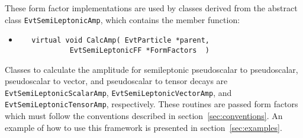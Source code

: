 \noindent These form factor implementations are used by classes
derived from the abstract class {\tt EvtSemiLeptonicAmp},
which contains the member function:
\begin{itemize}
\item \begin{verbatim}   virtual void CalcAmp( EvtParticle *parent,
            EvtSemiLeptonicFF *FormFactors  ) 
\end{verbatim}
\end{itemize}
Classes to calculate the amplitude for semileptonic pseudoscalar to
pseudoscalar, pseudoscalar to vector, and 
pseudoscalar to tensor decays are 
{\tt EvtSemiLeptonicScalarAmp},
{\tt EvtSemiLeptonicVectorAmp}, and
{\tt EvtSemiLeptonicTensorAmp}, 
respectively.  These routines are passed form factors which
must follow the conventions described in section~\ref{sec:conventions}.
An example of how to use this framework is presented in 
section~\ref{sec:examples}.
 
